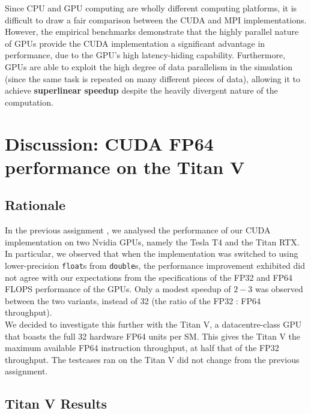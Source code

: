 \documentclass[12pt]{article}
\begin{document}
Since CPU and GPU computing are wholly different computing platforms, it is difficult to draw a fair comparison between the CUDA and MPI implementations.\\

However, the empirical benchmarks demonstrate that the highly parallel nature of GPUs provide the CUDA implementation a significant advantage in performance, due to the GPU's high latency-hiding capability. Furthermore, GPUs are able to exploit the high degree of data parallelism in the simulation (since the same task is repeated on many different pieces of data), allowing it to achieve \textbf{superlinear speedup} despite the heavily divergent nature of the computation.
\pagebreak

\section{Discussion: CUDA FP64 performance on the Titan V}

\subsection{Rationale}
In the previous assignment \cite{assign1bref}, we analysed the performance of our CUDA implementation on two Nvidia GPUs, namely the Tesla T4 and the Titan RTX. In particular, we observed that when the implementation was switched to using lower-precision \texttt{float}s from \texttt{double}s, the performance improvement exhibited did not agree with our expectations from the specifications of the FP32 and FP64 FLOPS performance of the GPUs. Only a modest speedup of $2 - 3$ was observed between the two variants, instead of 32 (the ratio of the FP32 : FP64 throughput). \\

We decided to investigate this further with the Titan V, a datacentre-class GPU that boasts the full 32 hardware FP64 units per SM. This gives the Titan V the maximum available FP64 instruction throughput, at half that of the FP32 throughput. The testcases ran on the Titan V did not change from the previous assignment.

\subsection{Titan V Results}
\end{document}
